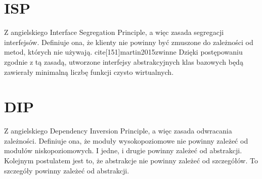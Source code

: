 \section{ISP}
Z angielskiego Interface Segregation Principle, a więc zasada segregacji interfejsów.
Definiuje ona, że klienty nie powinny być zmuszone do zależności od metod, których nie używają.
cite[151]{martin2015zwinne}
Dzięki postępowaniu zgodnie z tą zasadą, utworzone interfejsy abstrakcyjnych klas bazowych będą zawierały minimalną liczbę funkcji czysto wirtualnych.

\section{DIP}
Z angielskiego Dependency Inversion Principle, a więc zasada odwracania zależności.
Definiuje ona, że moduły wysokopoziomowe nie powinny zależeć od modułów niskopoziomowych. I jedne, i drugie powinny zależeć od abstrakcji.
\cite[141]{martin2015zwinne}
Kolejnym postulatem jest to, że abstrakcje nie powinny zależeć od szczegółów. To szczegóły powinny zależeć od abstrakcji.
\cite[141]{martin2015zwinne}
